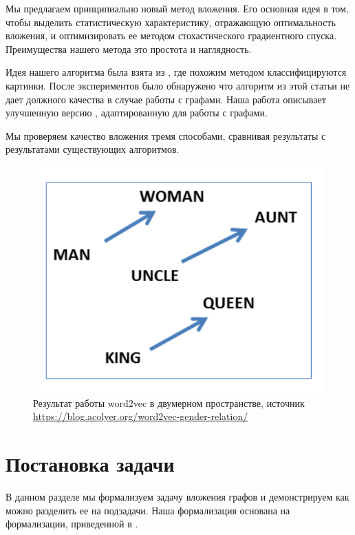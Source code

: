 \documentclass[12pt,a4paper]{extarticle}
\begin{document}
    
    Мы предлагаем принципиально новый метод вложения.
    Его основная идея в том, чтобы выделить статистическую характеристику, отражающую оптимальность вложения, и оптимизировать ее методом стохастического градиентного спуска.
    Преимущества нашего метода это простота и наглядность.
    
    Идея нашего алгоритма была взята из \cite{hist_loss}, где похожим методом классифицируются картинки.
    После экспериментов было обнаружено что алгоритм из этой статьи не дает должного качества в случае работы с графами. Наша работа описывает улучшенную версию \cite{hist_loss}, адаптированную для работы с графами.
    
    Мы проверяем качество вложения тремя способами, сравнивая результаты с результатами существующих алгоритмов.

    \begin{figure}
    \centering
    \includegraphics[width=.6\linewidth]{src/images/word2vec.png}
    \caption{Результат работы word2vec в двумерном пространстве, источник \url{https://blog.acolyer.org/word2vec-gender-relation/}}
    \label{fig:word2vec}
    \end{figure}

    \section{Постановка задачи}
    В данном разделе мы формализуем задачу вложения графов и демонстрируем как можно разделить ее на подзадачи. Наша формализация основана на формализации, приведенной в \cite{survey2}.
\end{document}
